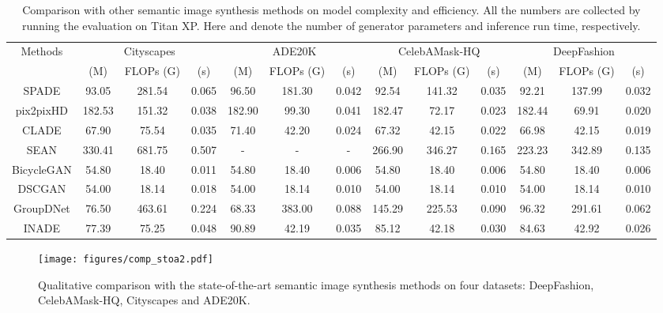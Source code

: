 \documentclass[final]{cvpr}
\begin{document}
\begin{table*}[t]
\setlength{\tabcolsep}{1.8mm}
    \centering
    \caption{Comparison with other semantic image synthesis methods on model complexity and efficiency. All the numbers are collected by running the evaluation on Titan XP. Here  and  denote the number of generator parameters and inference run time, respectively.}
\footnotesize
    \begin{tabular}{c|c|c|c|c|c|c|c|c|c|c|c|c}
    \hline
        \multirow{2}{*}{Methods} & \multicolumn{3}{c|}{Cityscapes} & \multicolumn{3}{c|}{ADE20K} & \multicolumn{3}{c|}{CelebAMask-HQ} & \multicolumn{3}{c}{DeepFashion}\\
        \cline{2-13}
         &  (M) & FLOPs (G) &  (s) &  (M) & FLOPs (G) &  (s) &  (M) & FLOPs (G) &  (s) &  (M) & FLOPs (G) &  (s)\\
        \hline
        SPADE & 93.05 & 281.54 & 0.065 & 96.50 & 181.30 & 0.042 & 92.54 & 141.32 & 0.035 & 92.21 & 137.99 & 0.032\\
        \hline
        pix2pixHD & 182.53 & 151.32 & 0.038 & 182.90 & 99.30 & 0.041 & 182.47 & 72.17 & 0.023 & 182.44 & 69.91 & 0.020\\
        \hline
        CLADE & 67.90 & 75.54 & 0.035 & 71.40 & 42.20 & 0.024 & 67.32 & 42.15 & 0.022 & 66.98 & 42.15 & 0.019\\
        \hline
        SEAN & 330.41 & 681.75 & 0.507 & - & - & - & 266.90 & 346.27 & 0.165 & 223.23 & 342.89 & 0.135\\
        \hline
        BicycleGAN & 54.80 & 18.40 & 0.011 & 54.80 & 18.40 & 0.006 & 54.80 & 18.40 & 0.006 & 54.80 & 18.40 & 0.006\\
        \hline
        DSCGAN & 54.00 & 18.14 & 0.018 & 54.00 & 18.14 & 0.010 & 54.00 & 18.14 & 0.010 & 54.00 & 18.14 & 0.010\\
        \hline
        GroupDNet & 76.50 & 463.61 & 0.224 & 68.33 & 383.00 & 0.088 & 145.29 & 225.53 & 0.090 & 96.32 & 291.61 & 0.062\\
        \hline
        INADE & 77.39 & 75.25 & 0.048 & 90.89 & 42.19 & 0.035 & 85.12 & 42.18 & 0.030 & 84.63 & 42.92 & 0.026\\
        \hline
    \end{tabular}
    \label{tab:comp_complexity}
\end{table*}{}

\begin{figure}[tp]
  \centering
  \texttt{[image: figures/comp\_stoa2.pdf]}
  \caption{Qualitative comparison with the state-of-the-art semantic image synthesis methods on four datasets: DeepFashion, CelebAMask-HQ, Cityscapes and ADE20K.}
  \label{fig:results_stoa}
\end{figure}
\end{document}
